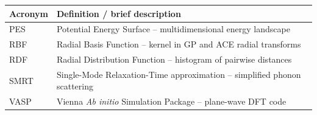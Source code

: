 \newpage
\begin{center}
\begin{tabular}{p{2.2cm} p{10.5cm}}
\textbf{\large Acronym} & \textbf{\large Definition / brief description}\\
\midrule\midrule
PES   & Potential Energy Surface – multidimensional energy landscape\\
RBF   & Radial Basis Function – kernel in GP and ACE radial transforms\\
RDF   & Radial Distribution Function – histogram of pairwise distances\\
SMRT  & Single-Mode Relaxation-Time approximation – simplified phonon scattering\\
VASP  & Vienna \textit{Ab initio} Simulation Package – plane-wave DFT code\\
\bottomrule
\end{tabular}
\end{center}
\newpage


